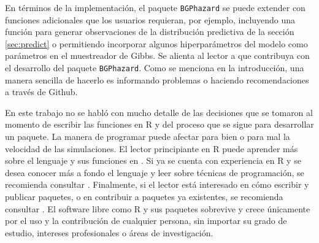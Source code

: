 \documentclass[11pt,a4paper]{article}
\begin{document}
En términos de la implementación, el paquete \texttt{BGPhazard} se puede extender con funciones adicionales que los usuarios requieran, por ejemplo, incluyendo una función para generar observaciones de la distribución predictiva de la sección \ref{sec:predict} o permitiendo incorporar algunos hiperparámetros del modelo como parámetros en el muestreador de Gibbs. Se alienta al lector a que contribuya con el desarrollo del paquete \texttt{BGPhazard}. Como se menciona en la introducción, una manera sencilla de hacerlo es informando problemas o haciendo recomendaciones a través de Github.

En este trabajo no se habló con mucho detalle de las decisiones que se tomaron al momento de escribir las funciones en R y del proceso que se sigue para desarrollar un paquete. La manera de programar puede afectar para bien o para mal la velocidad de las simulaciones. El lector principiante en R puede aprender más sobre el lenguaje y sus funciones en \citet{rfordatascience}. Si ya se cuenta con experiencia en R y se desea conocer más a fondo el lenguaje y leer sobre técnicas de programación, se recomienda consultar \citet{advanced_r}. Finalmente, si el lector está interesado en cómo escribir y publicar paquetes, o en contribuir a paquetes ya existentes, se recomienda consultar \citet{rpackages}. El software libre como R y sus paquetes sobrevive y crece únicamente por el uso y la contribución de cualquier persona, sin importar su grado de estudio, intereses profesionales o áreas de investigación.

\newpage
\end{document}
